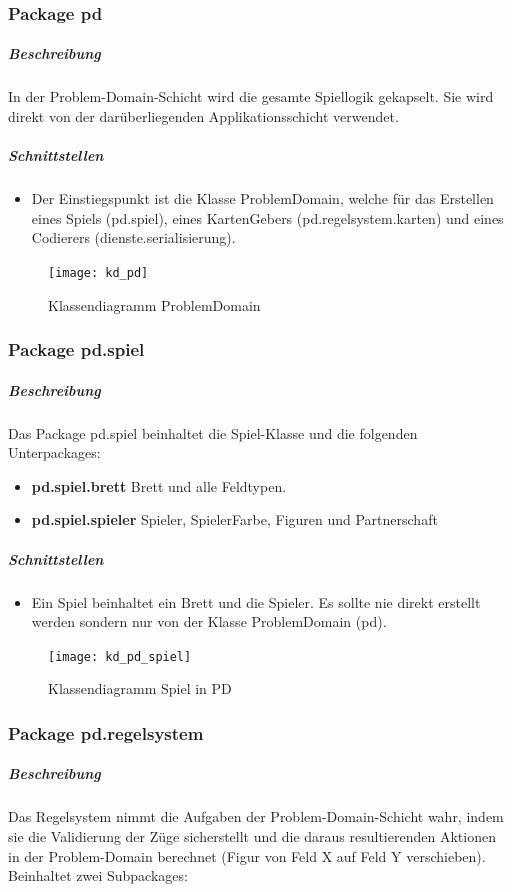 \documentclass[12pt,halfparskip]{scrartcl}
\begin{document}
\clearpage

\subsubsection{Package pd}
\label{ssub:package_pd}
\subparagraph{Beschreibung}
In der Problem-Domain-Schicht wird die gesamte Spiellogik gekapselt. Sie wird direkt von der darüberliegenden Applikationsschicht verwendet.

\subparagraph{Schnittstellen}
\begin{itemize}
	\item Der Einstiegspunkt ist die Klasse ProblemDomain, welche für das Erstellen eines Spiels (pd.spiel), eines KartenGebers (pd.regelsystem.karten) und eines Codierers (dienste.serialisierung).
\end{itemize}

\label{ssub:diagramme}
\begin{figure}[h]
	\centering
	\texttt{[image: kd\_pd]}
	\caption{Klassendiagramm ProblemDomain}
	\label{fig:kd_pd}
\end{figure}

\clearpage
\subsubsection{Package pd.spiel}

\subparagraph{Beschreibung}
Das Package pd.spiel beinhaltet die Spiel-Klasse und die folgenden  Unterpackages:

\begin{itemize}
	\item \textbf{pd.spiel.brett} Brett und alle Feldtypen.
	\item \textbf{pd.spiel.spieler} Spieler, SpielerFarbe, Figuren und Partnerschaft
\end{itemize}

\subparagraph{Schnittstellen}
\begin{itemize}
	\item Ein Spiel beinhaltet ein Brett und die Spieler. Es sollte nie direkt erstellt werden sondern nur von der Klasse ProblemDomain (pd).
\end{itemize}

\label{ssub:diagramme}
\begin{figure}[h]
	\centering
	\texttt{[image: kd\_pd\_spiel]}
	\caption{Klassendiagramm Spiel in PD}
	\label{fig:kd_pd_spiel}
\end{figure}

\clearpage
\subsubsection{Package pd.regelsystem}
\subparagraph{Beschreibung}
Das Regelsystem nimmt die Aufgaben der Problem-Domain-Schicht wahr, indem sie die Validierung der Züge sicherstellt und die daraus resultierenden Aktionen in der Problem-Domain berechnet (Figur von Feld X auf Feld Y verschieben). Beinhaltet zwei Subpackages:
\end{document}
